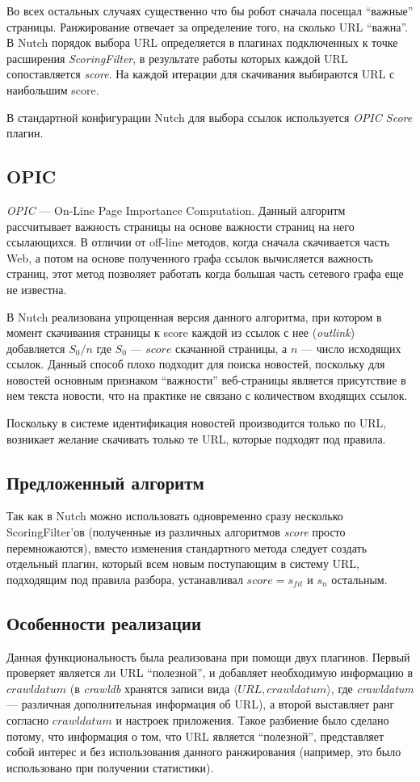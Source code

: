 Во всех остальных случаях существенно что бы робот сначала посещал ``важные'' страницы. Ранжирование отвечает за определение того, на сколько URL ``важна''.
В Nutch порядок выбора URL определяется в плагинах подключенных к точке расширения \textit{ScoringFilter}, в результате работы которых каждой URL сопоставляется \textit{score}. На каждой итерации для скачивания выбираются URL с наибольшим score.

В стандартной конфигурации Nutch для выбора ссылок используется \textit{OPIC Score} плагин.
\subsection{OPIC}
\textit{OPIC} --- On-Line Page Importance Computation\cite{opic}. Данный алгоритм рассчитывает важность страницы на основе важности страниц на него ссылающихся. В отличии от off-line методов, когда сначала скачивается часть Web, а потом на основе полученного графа ссылок вычисляется важность страниц, этот метод позволяет работать когда большая часть сетевого графа еще не известна.

В Nutch реализована упрощенная версия данного алгоритма, при котором в момент скачивания страницы к score каждой из ссылок с нее (\textit{outlink}) добавляется $S_{0}/n$ где $S_{0}$ --- $score$ скачанной страницы, а $n$ --- число исходящих ссылок. Данный способ плохо подходит для поиска новостей, поскольку для новостей основным признаком ``важности'' веб-страницы является присутствие в нем текста новости, что на практике не связано с количеством входящих ссылок.

Поскольку в системе идентификация новостей производится только по URL, возникает желание скачивать только те URL, которые подходят под правила.

\subsection{Предложенный алгоритм}
Так как в Nutch можно использовать одновременно сразу несколько ScoringFilter'ов (полученные из различных алгоритмов \textit{score} просто перемножаются), вместо изменения стандартного метода следует создать отдельный плагин, который всем новым поступающим в систему URL, подходящим под правила разбора, устанавливал $score=s_{fit}$ и $s_{n}$ остальным.
\subsection{Особенности реализации}
Данная функциональность была реализована при помощи двух плагинов. Первый проверяет является ли URL ``полезной'', и добавляет необходимую информацию в $crawldatum$ (в \textit{crawldb} хранятся записи вида $\langle URL, crawldatum\rangle$, где \textit{crawldatum} --- различная дополнительная информация об URL), а второй выставляет ранг согласно $crawldatum$ и настроек приложения. Такое разбиение было сделано потому, что информация о том, что URL является ``полезной'', представляет собой интерес и без использования данного ранжирования (например, это было использовано при получении статистики).
